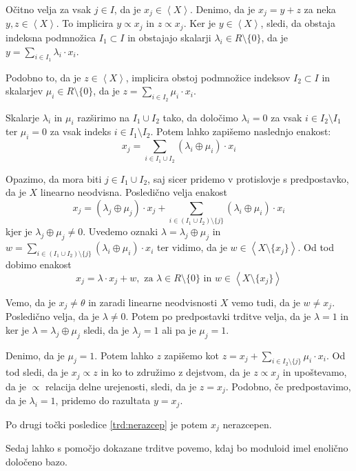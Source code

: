 \documentclass[mat1]{fmfdelo}
\newcommand{\Gen}[1]{\ensuremath{\left<{#1}\right>}}
\begin{document}
\begin{dokaz}
	Očitno velja za vsak $j\in I$, da je $x_j\in\Gen{X}$. Denimo, da je $x_j = y + z$ za neka $y, z\in\Gen{X}$. To implicira $y\varpropto x_j$ in $z\varpropto x_j$. 
	Ker je $y\in\Gen{X}$, sledi, da obstaja indeksna podmnožica $I_1 \subset I$ in obstajajo skalarji $\lambda_i\in R\setminus\{0\}$, da je $y = \sum_{i \in I_1}\lambda_i\cdot x_i$. 
	
	Podobno to, da je $z\in\Gen{X}$, implicira obstoj podmnožice indeksov $I_2\subset I$ in skalarjev $\mu_i\in R\setminus\{0\}$, da je $z = \sum_{i\in I_2}\mu_i\cdot x_i$. 
	
	Skalarje $\lambda_i$ in $\mu_i$ razširimo na $I_1\cup I_2$ tako, da določimo $\lambda_i = 0$ za vsak $i\in I_2\setminus I_1$ ter $\mu_i = 0$ za vsak indeks $i\in I_1\setminus I_2$. Potem lahko zapišemo naslednjo enakost: $$x_j = \sum_{i\in I_1\cup I_2}(\lambda_i \oplus\mu_i)\cdot x_i$$
	
	Opazimo, da mora biti $j\in I_1\cup I_2$, saj sicer pridemo v protislovje s predpostavko, da je $X$ linearno neodvisna. Posledično velja enakost $$ x_j = (\lambda_j\oplus\mu_j)\cdot x_j + \sum_{i\in (I_1\cup I_2)\setminus\{j\}}(\lambda_i\oplus\mu_i)\cdot x_i $$
	kjer je $\lambda_j\oplus\mu_j\neq 0$. Uvedemo oznaki $\lambda = \lambda_j\oplus\mu_j$ in $w = \sum_{i\in (I_1\cup I_2)\setminus\{j\}}(\lambda_i\oplus\mu_i)\cdot x_i$ ter vidimo, da je $w\in\Gen{X\setminus\{x_j\}}$. Od tod dobimo enakost $$x_j = \lambda\cdot x_j + w,\text{~za~} \lambda\in R\setminus\{0\}\text{~in~} w\in\Gen{X\setminus\{x_j\}} $$
	
	Vemo, da je $x_j\neq \theta$ in zaradi linearne neodvisnosti $X$ vemo tudi, da je $w\neq x_j$. Posledično velja, da je $\lambda\neq 0$. Potem po predpostavki trditve velja, da je $\lambda = 1$ in ker je $\lambda = \lambda_j\oplus\mu_j$ sledi, da je $\lambda_j = 1$ ali pa je $\mu_j = 1$. 
	
	Denimo, da je $\mu_j = 1$. Potem lahko $z$ zapišemo kot $z = x_j + \sum_{i\in I_2\setminus\{j\}}\mu_i\cdot x_i$. Od tod sledi, da je $x_j\varpropto z$ in ko to združimo z dejstvom, da je $z \varpropto x_j$ in upoštevamo, da je $\varpropto$ relacija delne urejenosti, sledi, da je $z = x_j$. Podobno, če predpostavimo, da je $\lambda_i = 1$, pridemo do razultata $y = x_j$.
	
	Po drugi točki posledice \ref{trd:nerazcep} je potem $x_j$ nerazcepen.
\end{dokaz}

Sedaj lahko s pomočjo dokazane trditve povemo, kdaj bo moduloid imel enolično določeno bazo.
\end{document}
